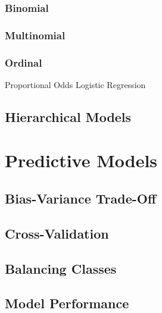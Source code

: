 \documentclass[]{book}
\begin{document}
\hypertarget{binomial}{%
\subsection{Binomial}\label{binomial}}

\hypertarget{multinomial}{%
\subsection{Multinomial}\label{multinomial}}

\hypertarget{ordinal}{%
\subsection{Ordinal}\label{ordinal}}

Proportional Odds Logistic Regression

\hypertarget{hierarchical-models}{%
\section{Hierarchical Models}\label{hierarchical-models}}

\hypertarget{predictive-models}{%
\chapter{Predictive Models}\label{predictive-models}}

\hypertarget{bias-variance-trade-off}{%
\section{Bias-Variance Trade-Off}\label{bias-variance-trade-off}}

\hypertarget{cross-validation}{%
\section{Cross-Validation}\label{cross-validation}}

\hypertarget{balancing-classes}{%
\section{Balancing Classes}\label{balancing-classes}}

\hypertarget{model-performance}{%
\section{Model Performance}\label{model-performance}}
\end{document}
